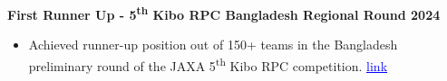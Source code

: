 \noindent
{\noindent\fontsize{12pt}{15pt}\bfseries First Runner Up - 5\textsuperscript{th} Kibo RPC Bangladesh Regional Round 2024}
\begin{itemize}
    \item Achieved runner-up position out of 150+ teams in the Bangladesh preliminary round of the JAXA 5\textsuperscript{th} Kibo RPC competition. \href{https://github.com/humam-hossain/humam-hossain/blob/main/certs/krpc5_regional_runner_up.pdf}{\textcolor{blue}{\underline{link}}}
\end{itemize}